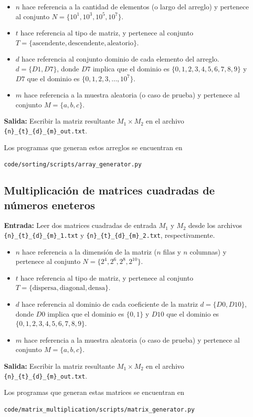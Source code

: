 \documentclass[11pt,spanish]{article}
\begin{document}
\begin{itemize}
  \item $n$ hace referencia a la cantidad de elementos (o largo del arreglo) y pertenece al conjunto $N = \{10^1, 10^3, 10^5, 10^7\}$.
  \item $t$ hace referencia al tipo de matriz, y pertenece al conjunto $T = \{\text{ascendente}, \text{descendente}, \text{aleatorio}\}$.
  \item $d$ hace referencia al conjunto dominio de cada elemento del arreglo. $d = \{D1, D7\}$, donde $D7$ implica que el dominio es $\{0,1,2,3,4,5,6,7,8,9\}$ y $D7$ que el dominio es $\{0,1,2,3,\dots,10^7\}$.
  \item $m$ hace referencia a la muestra aleatoria (o caso de prueba) y pertenece al conjunto $M = \{a, b, c\}$.
\end{itemize}

\textbf{Salida:} Escribir la matriz resultante $M_1 \times M_2$ en el archivo \verb|{n}_{t}_{d}_{m}_out.txt|.

Los programas que generan estos arreglos se encuentran en

\begin{center}
  \verb|code/sorting/scripts/array_generator.py|
\end{center}

\subsection{Multiplicación de matrices cuadradas de números eneteros}

\textbf{Entrada:} Leer dos matrices cuadradas de entrada $M_1$ y $M_2$ desde los archivos \verb|{n}_{t}_{d}_{m}_1.txt| y \verb|{n}_{t}_{d}_{m}_2.txt|, respectivamente.

\begin{itemize}
  \item $n$ hace referencia a la dimensión de la matriz ($n$ filas y $n$ columnas) y pertenece al conjunto $N = \{2^4, 2^6, 2^8, 2^{10}\}$.
  \item $t$ hace referencia al tipo de matriz, y pertenece al conjunto $T = \{\text{dispersa}, \text{diagonal}, \text{densa}\}$.
  \item $d$ hace referencia al dominio de cada coeficiente de la matriz $d = \{D0, D10\}$, donde $D0$ implica que el dominio es $\{0,1\}$ y $D10$ que el dominio es $\{0,1,2,3,4,5,6,7,8,9\}$.
  \item $m$ hace referencia a la muestra aleatoria (o caso de prueba) y pertenece al conjunto $M = \{a, b, c\}$.
\end{itemize}

\textbf{Salida:} Escribir la matriz resultante $M_1 \times M_2$ en el archivo \verb|{n}_{t}_{d}_{m}_out.txt|.

Los programas que generan estas matrices se encuentran en

\begin{center}
  \verb|code/matrix_multiplication/scripts/matrix_generator.py|
\end{center}
\end{document}
